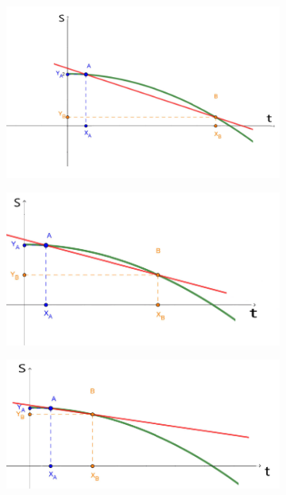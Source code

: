 \documentclass{report} \usepackage[T1]{fontenc} \usepackage[italian]{babel}
\begin{document}
\begin{figure}[H]
\centering
  \begin{subfigure}[b]{0.49\textwidth}
  \includegraphics[width=\textwidth]{tg1}
  \end{subfigure}
  \begin{subfigure}[b]{0.49\textwidth}
  \includegraphics[width=\textwidth]{tg2}
  \end{subfigure}
  \begin{subfigure}[b]{0.49\textwidth}
  \includegraphics[width=\textwidth]{tg3}

\end{subfigure}
\end{figure}
\end{document}
